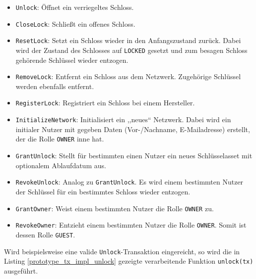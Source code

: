             \begin{itemize}
                \item \colorbox{light-gray}{\lstinline{Unlock}}: Öffnet ein verriegeltes Schloss.
                \item \colorbox{light-gray}{\lstinline{CloseLock}}: Schließt ein offenes Schloss.
                \item \colorbox{light-gray}{\lstinline{ResetLock}}: Setzt ein Schloss wieder in den Anfangszustand zurück.
                    Dabei wird der Zustand des Schlosses auf \colorbox{light-gray}{\lstinline{LOCKED}} gesetzt und zum besagen Schloss gehörende Schlüssel wieder entzogen.
                \item \colorbox{light-gray}{\lstinline{RemoveLock}}: Entfernt ein Schloss aus dem Netzwerk.
                    Zugehörige Schlüssel werden ebenfalls entfernt.
                \item \colorbox{light-gray}{\lstinline{RegisterLock}}: Registriert ein Schloss bei einem Hersteller. 
                \item \colorbox{light-gray}{\lstinline{InitializeNetwork}}: Initialisiert ein ,,neues`` Netzwerk.
                    Dabei wird ein initialer Nutzer mit gegeben Daten (Vor-/Nachname, E-Mailadresse) erstellt, der die Rolle \colorbox{light-gray}{\lstinline{OWNER}} inne hat.
                \item \colorbox{light-gray}{\lstinline{GrantUnlock}}: Stellt für bestimmten einen Nutzer ein neues Schlüsselasset mit optionalem Ablaufdatum aus. 
                \item \colorbox{light-gray}{\lstinline{RevokeUnlock}}: Analog zu \colorbox{light-gray}{\lstinline{GrantUnlock}}. Es wird einem bestimmten Nutzer der Schlüssel für ein bestimmtes Schloss wieder entzogen.
                \item \colorbox{light-gray}{\lstinline{GrantOwner}}: Weist einem bestimmten Nutzer die Rolle \colorbox{light-gray}{\lstinline{OWNER}} zu.
                \item \colorbox{light-gray}{\lstinline{RevokeOwner}}: Entzieht einem bestimmten Nutzer die Rolle \colorbox{light-gray}{\lstinline{OWNER}}.
                Somit ist dessen Rolle \colorbox{light-gray}{\lstinline{GUEST}}.
            \end{itemize}
            Wird beispielsweise eine valide \colorbox{light-gray}{\lstinline{Unlock}}-Transaktion eingereicht, so wird die in Listing \ref{prototype_tx_impl_unlock} gezeigte verarbeitende Funktion \colorbox{light-gray}{\lstinline{unlock(tx)}} ausgeführt. 
